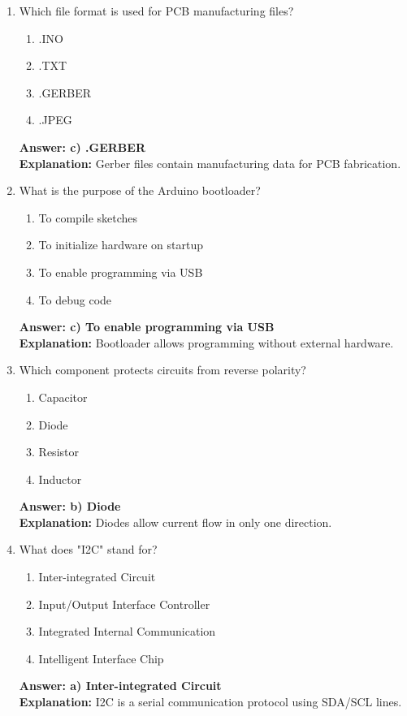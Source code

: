 \documentclass{article}
\begin{document}
\begin{enumerate}
		\item Which file format is used for PCB manufacturing files?
		\begin{enumerate}
			\item .INO
			\item .TXT
			\item .GERBER
			\item .JPEG
		\end{enumerate}
		\textbf{Answer: c) .GERBER} \\
		\textbf{Explanation:} Gerber files contain manufacturing data for PCB fabrication.
		
		\item What is the purpose of the Arduino bootloader?
		\begin{enumerate}
			\item To compile sketches
			\item To initialize hardware on startup
			\item To enable programming via USB
			\item To debug code
		\end{enumerate}
		\textbf{Answer: c) To enable programming via USB} \\
		\textbf{Explanation:} Bootloader allows programming without external hardware.
		
		\item Which component protects circuits from reverse polarity?
		\begin{enumerate}
			\item Capacitor
			\item Diode
			\item Resistor
			\item Inductor
		\end{enumerate}
		\textbf{Answer: b) Diode} \\
		\textbf{Explanation:} Diodes allow current flow in only one direction.
		
		\item What does "I2C" stand for?
		\begin{enumerate}
			\item Inter-integrated Circuit
			\item Input/Output Interface Controller
			\item Integrated Internal Communication
			\item Intelligent Interface Chip
		\end{enumerate}
		\textbf{Answer: a) Inter-integrated Circuit} \\
		\textbf{Explanation:} I2C is a serial communication protocol using SDA/SCL lines.
		

\end{enumerate}
\end{document}
